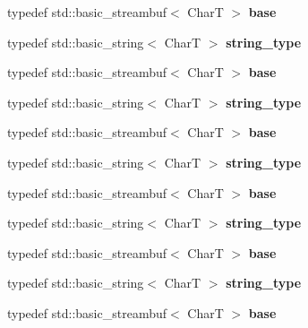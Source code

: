 \begin{DoxyCompactItemize}
typedef std\+::basic\+\_\+streambuf$<$ CharT $>$ {\bfseries base}
\item 
\mbox{\label{structtestbuf_a0576cc53e1f395f08cee680528575b9f}} 
typedef std\+::basic\+\_\+string$<$ CharT $>$ {\bfseries string\+\_\+type}
\item 
\mbox{\label{structtestbuf_a24884ed0e0845a4640bb2b7cbdf60ad6}} 
typedef std\+::basic\+\_\+streambuf$<$ CharT $>$ {\bfseries base}
\item 
\mbox{\label{structtestbuf_a0576cc53e1f395f08cee680528575b9f}} 
typedef std\+::basic\+\_\+string$<$ CharT $>$ {\bfseries string\+\_\+type}
\item 
\mbox{\label{structtestbuf_a24884ed0e0845a4640bb2b7cbdf60ad6}} 
typedef std\+::basic\+\_\+streambuf$<$ CharT $>$ {\bfseries base}
\item 
\mbox{\label{structtestbuf_a0576cc53e1f395f08cee680528575b9f}} 
typedef std\+::basic\+\_\+string$<$ CharT $>$ {\bfseries string\+\_\+type}
\item 
\mbox{\label{structtestbuf_a24884ed0e0845a4640bb2b7cbdf60ad6}} 
typedef std\+::basic\+\_\+streambuf$<$ CharT $>$ {\bfseries base}
\item 
\mbox{\label{structtestbuf_a0576cc53e1f395f08cee680528575b9f}} 
typedef std\+::basic\+\_\+string$<$ CharT $>$ {\bfseries string\+\_\+type}
\item 
\mbox{\label{structtestbuf_a24884ed0e0845a4640bb2b7cbdf60ad6}} 
typedef std\+::basic\+\_\+streambuf$<$ CharT $>$ {\bfseries base}
\item 
\mbox{\label{structtestbuf_a0576cc53e1f395f08cee680528575b9f}} 
typedef std\+::basic\+\_\+string$<$ CharT $>$ {\bfseries string\+\_\+type}
\item 
\mbox{\label{structtestbuf_a24884ed0e0845a4640bb2b7cbdf60ad6}} 
typedef std\+::basic\+\_\+streambuf$<$ CharT $>$ {\bfseries base}
\item 
\mbox{\label{structtestbuf_a0576cc53e1f395f08cee680528575b9f}} 

\end{DoxyCompactItemize}
